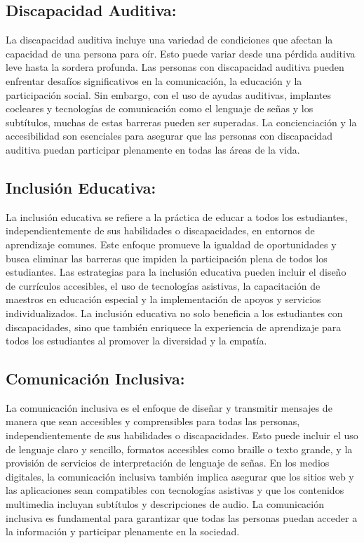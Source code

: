 \subsection{Discapacidad Auditiva: }
La discapacidad auditiva incluye una variedad de condiciones que afectan la capacidad de una persona para oír. Esto puede variar desde una pérdida auditiva leve hasta la sordera profunda. Las personas con discapacidad auditiva pueden enfrentar desafíos significativos en la comunicación, la educación y la participación social. Sin embargo, con el uso de ayudas auditivas, implantes cocleares y tecnologías de comunicación como el lenguaje de señas y los subtítulos, muchas de estas barreras pueden ser superadas. La concienciación y la accesibilidad son esenciales para asegurar que las personas con discapacidad auditiva puedan participar plenamente en todas las áreas de la vida.
\subsection{Inclusión Educativa: }
La inclusión educativa se refiere a la práctica de educar a todos los estudiantes, independientemente de sus habilidades o discapacidades, en entornos de aprendizaje comunes. Este enfoque promueve la igualdad de oportunidades y busca eliminar las barreras que impiden la participación plena de todos los estudiantes. Las estrategias para la inclusión educativa pueden incluir el diseño de currículos accesibles, el uso de tecnologías asistivas, la capacitación de maestros en educación especial y la implementación de apoyos y servicios individualizados. La inclusión educativa no solo beneficia a los estudiantes con discapacidades, sino que también enriquece la experiencia de aprendizaje para todos los estudiantes al promover la diversidad y la empatía.
\subsection{Comunicación Inclusiva: }
La comunicación inclusiva es el enfoque de diseñar y transmitir mensajes de manera que sean accesibles y comprensibles para todas las personas, independientemente de sus habilidades o discapacidades. Esto puede incluir el uso de lenguaje claro y sencillo, formatos accesibles como braille o texto grande, y la provisión de servicios de interpretación de lenguaje de señas. En los medios digitales, la comunicación inclusiva también implica asegurar que los sitios web y las aplicaciones sean compatibles con tecnologías asistivas y que los contenidos multimedia incluyan subtítulos y descripciones de audio. La comunicación inclusiva es fundamental para garantizar que todas las personas puedan acceder a la información y participar plenamente en la sociedad.
